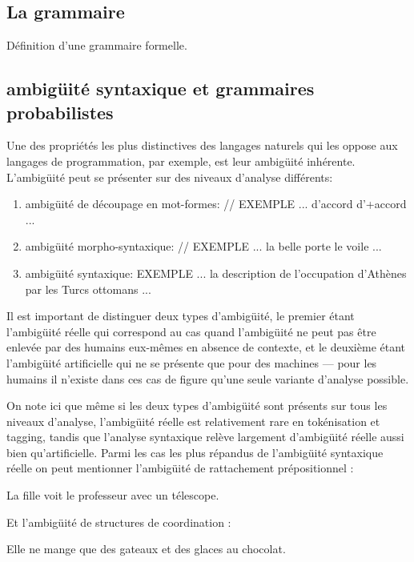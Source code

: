 \documentclass[12pt]{article}
\begin{document}
\subsection{La grammaire}

D\'efinition d'une grammaire formelle.

\subsection{ambig\"uit\'e syntaxique et grammaires probabilistes}

Une des propri\'et\'es les plus distinctives des langages naturels qui les
oppose aux langages de programmation, par exemple, est leur ambig\"uit\'e inh\'erente. L'ambig\"uit\'e peut se pr\'esenter sur des niveaux d'analyse diff\'erents:
\begin{enumerate}
\item ambig\"uit\'e de d\'ecoupage en mot-formes:
//
EXEMPLE ... d'accord d'+accord ...
\item ambig\"uit\'e morpho-syntaxique:
//
EXEMPLE ... la belle porte le voile ...
\item ambig\"uit\'e syntaxique:
EXEMPLE ... la description de l'occupation d'Ath\`enes par les Turcs ottomans ... 
\end{enumerate}

Il est important de distinguer deux types d'ambig\"uit\'e, le
premier \'etant l'ambig\"uit\'e r\'eelle qui correspond au cas quand l'ambig\"uit\'e
ne peut pas \^etre enlev\'ee par des humains eux-m\^emes en absence de contexte,
et le deuxi\`eme \'etant l'ambig\"uit\'e artificielle qui ne se pr\'esente que pour des machines --- pour les humains il n'existe dans ces cas de figure qu'une seule variante d'analyse possible.

On note ici que m\^eme si les deux types d'ambig\"uit\'e sont pr\'esents sur tous les niveaux d'analyse, l'ambig\"uit\'e r\'eelle est relativement rare en tok\'enisation et tagging, tandis que l'analyse syntaxique
rel\`eve largement d'ambig\"uit\'e r\'eelle aussi bien qu'artificielle. Parmi les cas les plus r\'epandus de l'ambig\"uit\'e syntaxique r\'eelle on peut mentionner l'ambig\"uit\'e de rattachement pr\'epositionnel : 

\begin{exe}
\ex La fille voit le professeur avec un t\'elescope.
\end{exe}

Et l'ambig\"uit\'e de structures de coordination :

\begin{exe}
\ex Elle ne mange que des gateaux et des glaces au chocolat.
\end{exe}
\end{document}
